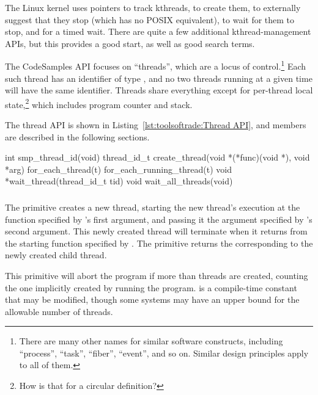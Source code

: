 The Linux kernel uses
 pointers to track kthreads,
 to create them,
 to externally suggest that they stop
(which has no POSIX equivalent),
 to wait for them to stop, and
 for a timed wait.
There are quite a few additional kthread-management APIs, but this
provides a good start, as well as good search terms.

The CodeSamples API focuses on ``threads'', which are a locus of
control.\footnote{
	There are many other names for similar software constructs, including
	``process'', ``task'', ``fiber'', ``event'', and so on.
	Similar design principles apply to all of them.}
Each such thread has an identifier of type ,
and no two threads running at a given time will have the same
identifier.
Threads share everything except for per-thread local state,\footnote{
	How is that for a circular definition?}
which includes program counter and stack.

The thread API is shown in
Listing~\ref{lst:toolsoftrade:Thread API}, and members are described in the
following sections.

\begin{listing}[tbp]
\begin{VerbatimL}[numbers=none,xleftmargin=2pt]
int smp_thread_id(void)
thread_id_t create_thread(void *(*func)(void *), void *arg)
for_each_thread(t)
for_each_running_thread(t)
void *wait_thread(thread_id_t tid)
void wait_all_threads(void)
\end{VerbatimL}
\caption{Thread API}
\label{lst:toolsoftrade:Thread API}
\end{listing}

\subsubsection{}

The  primitive creates a new thread,
starting the new thread's execution
at the function  specified by 's
first argument, and passing it the argument specified by
's second argument.
This newly created thread will terminate when it returns from the
starting function specified by .
The  primitive returns the 
corresponding to the newly created child thread.

This primitive will abort the program if more than 
threads are created, counting the one implicitly created by running
the program.
 is a compile-time constant that may be modified,
though some systems may have an upper bound for the allowable number
of threads.

